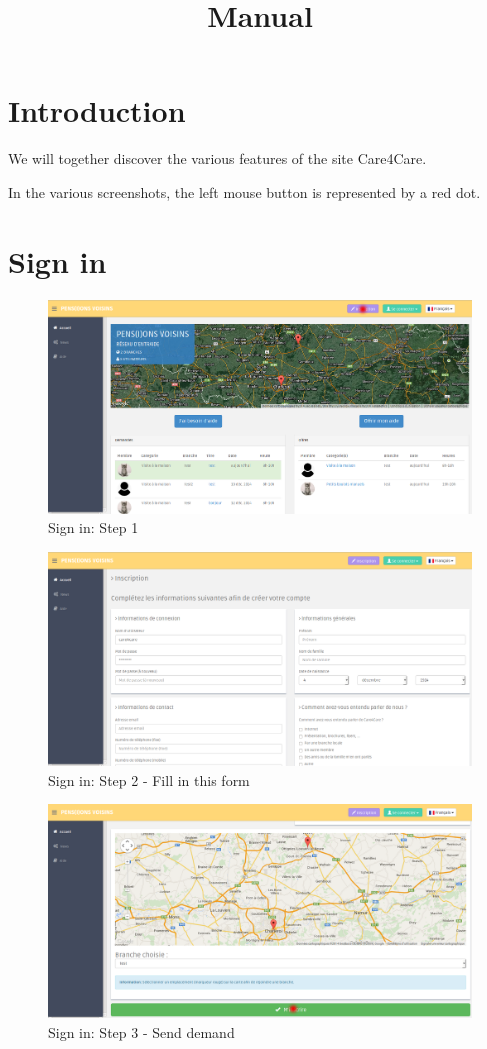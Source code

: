 \documentclass{article}
\title{Manual}
\begin{document}
\section{Introduction}
We will together discover the various features of the site Care4Care.

In the various screenshots, the left mouse button is represented by a red dot. 

\section{Sign in}
\begin{figure}[!ht]
   \includegraphics[width=\textwidth]{img/inscr1.png}
   \caption{Sign in: Step 1}
\end{figure}

\begin{figure}[!ht]
   \includegraphics[width=\textwidth]{img/inscr2.png}
   \caption{Sign in: Step 2 - Fill in this form}
\end{figure}

\begin{figure}[!ht]
   \includegraphics[width=\textwidth]{img/inscr3.png}
   \caption{Sign in: Step 3 - Send demand}
\end{figure}
\end{document}
